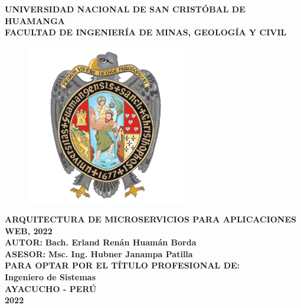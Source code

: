 \begin{titlepage}

\centering
  { \fontsize{18pt}{\baselineskip}\selectfont \textbf{UNIVERSIDAD NACIONAL DE SAN CRISTÓBAL DE HUAMANGA} }\\[0.25cm]
  { \fontsize{16pt}{\baselineskip}\selectfont \textbf{FACULTAD DE INGENIERÍA DE MINAS, GEOLOGÍA Y CIVIL} }\\[0.55cm]

  \begin{figure}[htb]
    \centering
    \includegraphics[height=7cm]{src/assets/unsch_logo.jpg}
  \end{figure}

\vspace{0.5cm}
{\fontsize{14pt}{ \baselineskip}\selectfont \textbf{
  ARQUITECTURA DE MICROSERVICIOS PARA APLICACIONES WEB, 2022
}}\\[0.5cm]
{\fontsize{14pt}{ \baselineskip}\selectfont \textbf{AUTOR:}}
{\fontsize{14pt}{ \baselineskip}\selectfont \textbf{Bach. Erland Renán Huamán Borda}}\\[0.8cm]
{\fontsize{14pt}{ \baselineskip}\selectfont \textbf{ASESOR:}}
{\fontsize{14pt}{ \baselineskip}\selectfont \textbf{Msc. Ing. Hubner Janampa Patilla}}\\[0.8cm]
{\fontsize{14pt}{ \baselineskip}\selectfont \textbf{PARA OPTAR POR EL TÍTULO PROFESIONAL DE:}}\\[0.8cm]
{\fontsize{14pt}{ \baselineskip}\selectfont \textbf{Ingeniero de Sistemas}}\\[0.5cm]

\vfill
{\fontsize{14pt}{ \baselineskip}\selectfont \textbf{AYACUCHO - PERÚ}}\\[0.5cm]
{\fontsize{14pt}{ \baselineskip}\selectfont \textbf{2022}}
\singlespacing

\end{titlepage}
\restoregeometry
